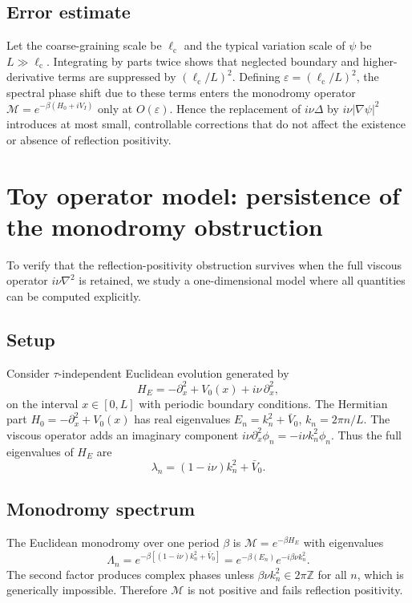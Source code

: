 \documentclass[11pt]{article}
\begin{document}
\subsection*{Error estimate}
Let the coarse-graining scale be $\ell_{\mathrm{c}}$ and the typical variation scale of $\psi$ be $L\gg\ell_{\mathrm{c}}$.
Integrating by parts twice shows that neglected boundary and higher-derivative terms are suppressed by $(\ell_{\mathrm{c}}/L)^2$.
Defining $\varepsilon=(\ell_{\mathrm{c}}/L)^2$, the spectral phase shift due to these terms enters the monodromy operator $\mathcal M=e^{-\beta(H_0+iV_I)}$ only at $O(\varepsilon)$.
Hence the replacement of $i\nu\Delta$ by $i\nu|\nabla\psi|^2$ introduces at most small, controllable corrections that do not affect the existence or absence of reflection positivity.

\section{Toy operator model: persistence of the monodromy obstruction}
\label{app:operator-toy}

To verify that the reflection-positivity obstruction survives when the full viscous operator $i\nu\nabla^2$ is retained, we study a one-dimensional model where all quantities can be computed explicitly.

\subsection*{Setup}
Consider $\tau$-independent Euclidean evolution generated by
\begin{equation}
    H_E = -\partial_x^2 + V_0(x) + i\nu\,\partial_x^2 ,
\end{equation}
on the interval $x\!\in\![0,L]$ with periodic boundary conditions.
The Hermitian part $H_0=-\partial_x^2+V_0(x)$ has real eigenvalues
$E_n = k_n^2 + \bar V_0$,
$k_n = 2\pi n/L$.
The viscous operator adds an imaginary component
$i\nu\partial_x^2 \phi_n = -i\nu k_n^2 \phi_n$.
Thus the full eigenvalues of $H_E$ are
\begin{equation}
    \lambda_n = (1 - i\nu)k_n^2 + \bar V_0 .
\end{equation}

\subsection*{Monodromy spectrum}
The Euclidean monodromy over one period $\beta$ is $\mathcal M = e^{-\beta H_E}$ with eigenvalues
\[
    \Lambda_n = e^{-\beta[(1 - i\nu)k_n^2 + \bar V_0]}
              = e^{-\beta(E_n)} e^{-i\beta\nu k_n^2}.
\]
The second factor produces complex phases unless $\beta\nu k_n^2\in2\pi\mathbb Z$ for all $n$, which is generically impossible.  Therefore $\mathcal M$ is not positive and fails reflection positivity.
\end{document}

